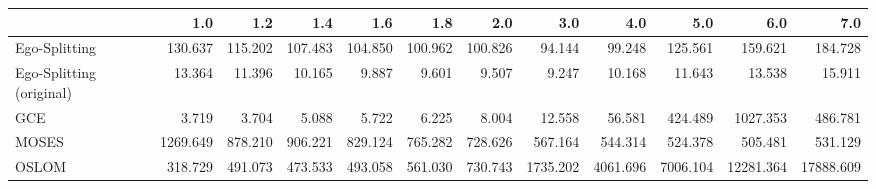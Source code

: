 \begin{tabular}{lrrrrrrrrrrr}
\toprule
{} &      1.0 &     1.2 &     1.4 &     1.6 &     1.8 &     2.0 &      3.0 &      4.0 &      5.0 &       6.0 &       7.0 \\
\midrule
Ego-Splitting            &  130.637 & 115.202 & 107.483 & 104.850 & 100.962 & 100.826 &   94.144 &   99.248 &  125.561 &   159.621 &   184.728 \\
Ego-Splitting (original) &   13.364 &  11.396 &  10.165 &   9.887 &   9.601 &   9.507 &    9.247 &   10.168 &   11.643 &    13.538 &    15.911 \\
GCE                      &    3.719 &   3.704 &   5.088 &   5.722 &   6.225 &   8.004 &   12.558 &   56.581 &  424.489 &  1027.353 &   486.781 \\
MOSES                    & 1269.649 & 878.210 & 906.221 & 829.124 & 765.282 & 728.626 &  567.164 &  544.314 &  524.378 &   505.481 &   531.129 \\
OSLOM                    &  318.729 & 491.073 & 473.533 & 493.058 & 561.030 & 730.743 & 1735.202 & 4061.696 & 7006.104 & 12281.364 & 17888.609 \\
\bottomrule
\end{tabular}
